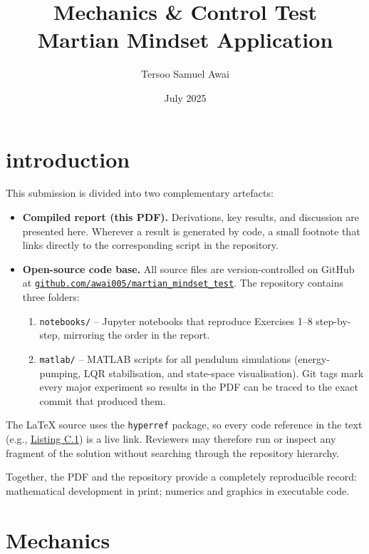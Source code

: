 \documentclass[12pt,a4paper]{article}
\title{Mechanics \& Control Test \\[2pt]\large Martian Mindset Application}
\author{Tersoo Samuel Awai}
\date{July 2025}
\begin{document}
\maketitle
\section*{introduction}
This submission is divided into two complementary artefacts:

\begin{itemize}
  \item \textbf{Compiled report (this PDF).}  
        Derivations, key results, and discussion are presented here.  
        Wherever a result is generated by code, a small footnote that
        links directly to the corresponding script in the repository.

  \item \textbf{Open-source code base.}  
        All source files are version-controlled on GitHub at  
        \href{https://github.com/Awai005/martian-mindset-mech-control-test}%
        {\texttt{github.com/\textlangle awai005\textrangle/martian\_mindset\_test}}.  
        The repository contains three folders:
        \begin{enumerate}
          \item \texttt{notebooks/} – Jupyter notebooks that reproduce
                Exercises 1–8 step-by-step, mirroring the order in the report.
          \item \texttt{matlab/} – MATLAB scripts for all pendulum simulations
                (energy-pumping, LQR stabilisation, and state-space visualisation).  
                Git tags mark every major experiment so results in the PDF can be
                traced to the exact commit that produced them.
        \end{enumerate}
\end{itemize}

The LaTeX source uses the \verb|hyperref| package, so every code reference in
the text (e.g., \href{https://github.com/Awai005/martian-mindset-mech-control-test/blob/main/code/control/exercise_7.m}{Listing C.1}) is a live link.
Reviewers may therefore run or inspect any fragment of the solution without
searching through the repository hierarchy.

Together, the PDF and the repository provide a completely reproducible record:
mathematical development in print; numerics and graphics in executable code.

\section{Mechanics}
\end{document}
